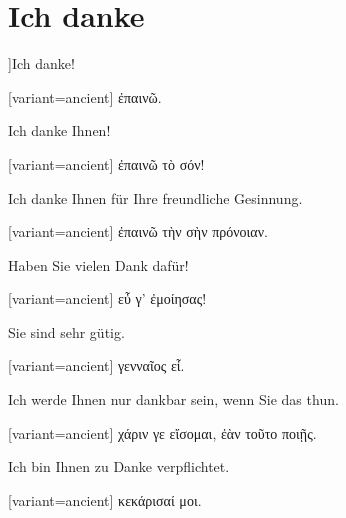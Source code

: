 \section{Ich danke}

]\indent Ich danke!

\switchcolumn

\begin{greek}[variant=ancient]%
ἐπαινῶ.

\end{greek}%
\switchcolumn*

Ich danke Ihnen!

\switchcolumn

\begin{greek}[variant=ancient]%
ἐπαινῶ τὸ σόν!

\end{greek}%
\switchcolumn*

Ich danke Ihnen für Ihre freundliche Gesinnung.

\switchcolumn

\begin{greek}[variant=ancient]%
ἐπαινῶ τὴν σὴν πρόνοιαν.

\end{greek}%
\switchcolumn*

Haben Sie vielen Dank dafür!

\switchcolumn

\begin{greek}[variant=ancient]%
εὖ γ' ἐμοίησας!

\end{greek}%
\switchcolumn*

Sie sind sehr gütig.

\switchcolumn

\begin{greek}[variant=ancient]%
γενναῖος εἶ.

\end{greek}%
\switchcolumn*

Ich werde Ihnen nur dankbar sein, wenn Sie das thun.

\switchcolumn

\begin{greek}[variant=ancient]%
χάριν γε εἴσομαι, ἐὰν τοῦτο ποιῇς.

\end{greek}%
\switchcolumn*

Ich bin Ihnen zu Danke verpflichtet.

\switchcolumn

\begin{greek}[variant=ancient]%
κεκάρισαί μοι.

\end{greek}%
\switchcolumn*

